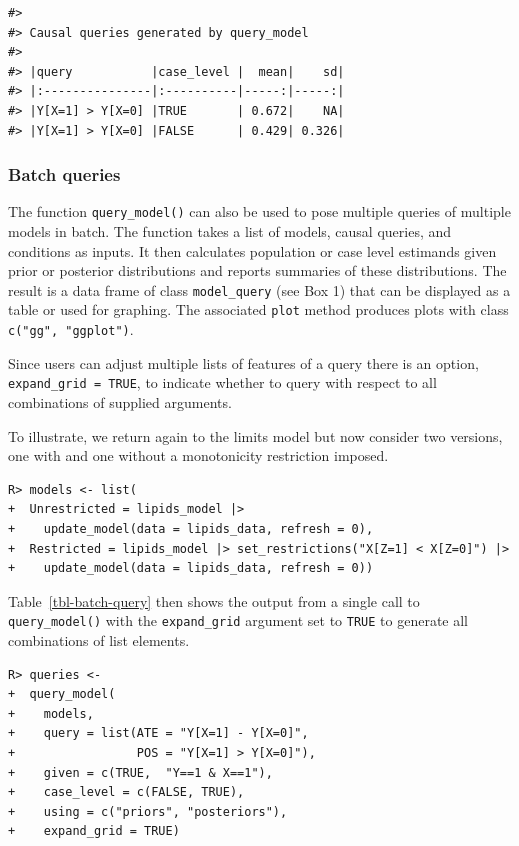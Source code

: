 \documentclass[
  11pt,
  article]{jss}
\begin{document}
\begin{verbatim}
#> 
#> Causal queries generated by query_model
#> 
#> |query           |case_level |  mean|    sd|
#> |:---------------|:----------|-----:|-----:|
#> |Y[X=1] > Y[X=0] |TRUE       | 0.672|    NA|
#> |Y[X=1] > Y[X=0] |FALSE      | 0.429| 0.326|
\end{verbatim}

\subsubsection{Batch queries}\label{batch-queries}

The function \texttt{query\_model()} can also be used to pose multiple
queries of multiple models in batch. The function takes a list of
models, causal queries, and conditions as inputs. It then calculates
population or case level estimands given prior or posterior
distributions and reports summaries of these distributions. The result
is a data frame of class \texttt{model\_query} (see Box 1) that can be
displayed as a table or used for graphing. The associated \texttt{plot}
method produces plots with class \texttt{c("gg",\ "ggplot")}.

Since users can adjust multiple lists of features of a query there is an
option, \texttt{expand\_grid\ =\ TRUE}, to indicate whether to query
with respect to all combinations of supplied arguments.

To illustrate, we return again to the limits model but now consider two
versions, one with and one without a monotonicity restriction imposed.

\begin{verbatim}
R> models <- list(
+  Unrestricted = lipids_model |> 
+    update_model(data = lipids_data, refresh = 0),
+  Restricted = lipids_model |> set_restrictions("X[Z=1] < X[Z=0]") |>
+    update_model(data = lipids_data, refresh = 0))
\end{verbatim}

Table~\ref{tbl-batch-query} then shows the output from a single call to
\texttt{query\_model()} with the \texttt{expand\_grid} argument set to
\texttt{TRUE} to generate all combinations of list elements.

\begin{verbatim}
R> queries <- 
+  query_model(
+    models,  
+    query = list(ATE = "Y[X=1] - Y[X=0]", 
+                 POS = "Y[X=1] > Y[X=0]"),
+    given = c(TRUE,  "Y==1 & X==1"),
+    case_level = c(FALSE, TRUE),
+    using = c("priors", "posteriors"),
+    expand_grid = TRUE)
\end{verbatim}
\end{document}
